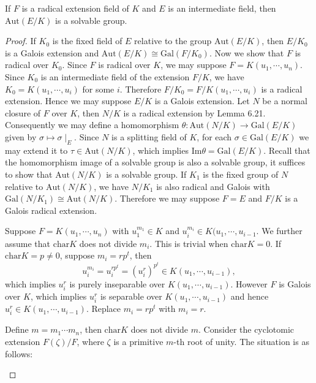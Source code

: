 \begin{theorem}
If $F$ is a radical extension field of $K$ and $E$ is an intermediate field, then $\mathrm{Aut}(E/K)$ is a solvable group.
\end{theorem}
\begin{proof}
If $K_0$ is the fixed field of $E$ relative to the group $\mathrm{Aut}(E/K)$, then $E/K_0$ is a Galois extension and $\mathrm{Aut}(E/K)\cong\mathrm{Gal}(F/K_0)$. Now we show that $F$ is radical over $K_0$. Since $F$ is radical over $K$, we may suppose $F=K(u_1,\cdots,u_n)$. Since $K_0$ is an intermediate field of the extension $F/K$, we have $K_0=K(u_1,\cdots,u_i)$ for some $i$. Therefore $F/K_0=F/K(u_1,\cdots,u_i)$ is a radical extension. Hence we may suppose $E/K$ is a Galois extension. Let $N$ be a normal closure of $F$ over $K$, then $N/K$ is a radical extension by Lemma 6.21. Consequently we may define a homomorphism $\theta:\mathrm{Aut}(N/K)\to\mathrm{Gal}(E/K)$ given by $\sigma\mapsto\sigma\mid_E$. Since $N$ is a splitting field of $K$, for each $\sigma\in\mathrm{Gal}(E/K)$ we may extend it to $\tau\in\mathrm{Aut}(N/K)$, which implies $\mathrm{Im}\theta=\mathrm{Gal}(E/K)$. Recall that the homomorphism image of a solvable group is also a solvable group, it suffices to show that $\mathrm{Aut}(N/K)$ is a solvable group. If $K_1$ is the fixed group of $N$ relative to $\mathrm{Aut}(N/K)$, we have $N/K_1$ is also radical and Galois with $\mathrm{Gal}(N/K_1)\cong\mathrm{Aut}(N/K)$. Therefore we may suppose $F=E$ and $F/K$ is a Galois radical extension.\par
Suppose $F=K(u_1,\cdots,u_n)$ with $u_1^{m_1}\in K$ and $u_i^{m_i}\in K(u_1,\cdots,u_{i-1}$. We further assume that $\mathrm{char}K$ does not divide $m_i$. This is trivial when $\mathrm{char}K=0$. If $\mathrm{char}K=p\ne 0$, suppose $m_i=rp^t$, then 
$$
u_{i}^{m_i}=u_{i}^{rp^t}=\left( u_{i}^{r} \right) ^{p^t}\in K\left( u_1,\cdots ,u_{i-1} \right) ,
$$
which implies $u_i^r$ is purely inseparable over $K(u_1,\cdots,u_{i-1})$. However $F$ is Galois over $K$, which implies $u_i^r$ is separable over $K(u_1,\cdots,u_{i-1})$ and hence $u_i^r\in K(u_1,\cdots,u_{i-1})$. Replace $m_i=rp^t$ with $m_i=r$.\par
Define $m=m_1\cdots m_n$, then $\mathrm{char}K$ does not divide $m$. Consider the cyclotomic extension $F(\zeta)/F$, where $\zeta$ is a primitive $m$-th root of unity. The situation is as follows: 
\begin{center}




\end{center}
\end{proof}
